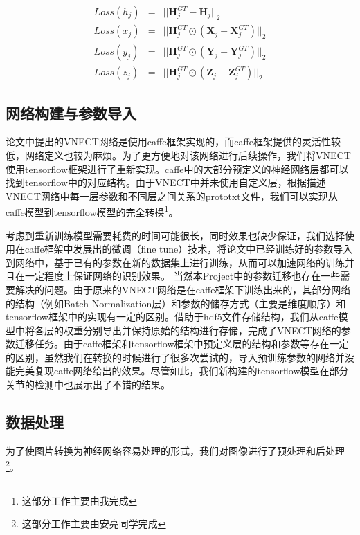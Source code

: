 \documentclass[a4paper, 10pt]{ctexart}
\newcommand{\bX}{\mathbf{X}}
\newcommand{\bY}{\mathbf{Y}}
\newcommand{\bZ}{\mathbf{Z}}
\newcommand{\bH}{\mathbf{H}}
\begin{document}
\begin{eqnarray}
        Loss(h_j)&=& || \bH^{GT}_{j}-\bH_j ||_2 \label{eqn:h}\\
        Loss(x_j)&=& || \bH^{GT}_{j}\odot(\bX_j-\bX^{GT}_{j}) ||_2 \label{eqn:x}\\
        Loss(y_j)&=& || \bH^{GT}_{j}\odot(\bY_j-\bY^{GT}_{j}) ||_2 \label{eqn:y}\\
        Loss(z_j)&=& || \bH^{GT}_{j}\odot(\bZ_j-\bZ^{GT}_{j}) ||_2 \label{eqn:z}
\end{eqnarray}


\subsection{网络构建与参数导入}


论文\cite{mehta2017vnect}中提出的VNECT网络是使用caffe框架实现的，而caffe框架提供的灵活性较低，网络定义也较为麻烦。为了更方便地对该网络进行后续操作，我们将VNECT使用tensorflow框架进行了重新实现。caffe中的大部分预定义的神经网络层都可以找到tensorflow中的对应结构。由于VNECT中并未使用自定义层，根据描述VNECT网络中每一层参数和不同层之间关系的prototxt文件，我们可以实现从caffe模型到tensorflow模型的完全转换\footnote{这部分工作主要由我完成}。

考虑到重新训练模型需要耗费的时间可能很长，同时效果也缺少保证，我们选择使用在caffe框架中发展出的微调（fine tune）技术，将论文中已经训练好的参数导入到网络中，基于已有的参数在新的数据集上进行训练，从而可以加速网络的训练并且在一定程度上保证网络的识别效果。
当然本Project中的参数迁移也存在一些需要解决的问题。由于原来的VNECT网络是在caffe框架下训练出来的，其部分网络的结构（例如Batch Normalization层\cite{ioffe1502batch}）和参数的储存方式（主要是维度顺序）和tensorflow框架中的实现有一定的区别。借助于hdf5\cite{folk1999hdf5}文件存储结构，我们从caffe模型中将各层的权重分别导出并保持原始的结构进行存储，完成了VNECT网络的参数迁移任务。由于caffe框架和tensorflow框架中预定义层的结构和参数等存在一定的区别，虽然我们在转换的时候进行了很多次尝试的，导入预训练参数的网络并没能完美复现caffe网络给出的效果。尽管如此，我们新构建的tensorflow模型在部分关节的检测中也展示出了不错的结果。

\subsection{数据处理}
为了使图片转换为神经网络容易处理的形式，我们对图像进行了预处理和后处理\footnote{这部分工作主要由安亮同学完成}。
\end{document}
